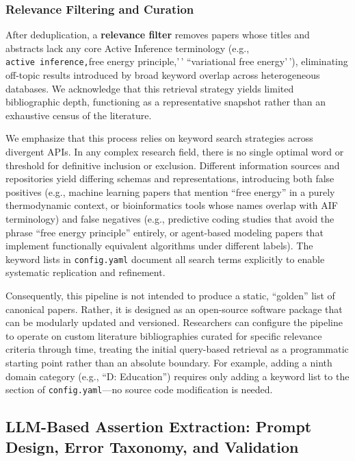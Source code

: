 \documentclass[
  english,
]{article}
\begin{document}
\subsubsection{Relevance Filtering and
Curation}\label{relevance-filtering-and-curation}

After deduplication, a \textbf{relevance filter} removes papers whose
titles and abstracts lack any core Active Inference terminology (e.g.,
\texttt{active\ inference,\textquotesingle{}\textquotesingle{}}free
energy principle,'\,' ``variational free energy'\,'), eliminating
off-topic results introduced by broad keyword overlap across
heterogeneous databases. We acknowledge that this retrieval strategy
yields limited bibliographic depth, functioning as a representative
snapshot rather than an exhaustive census of the literature.

We emphasize that this process relies on keyword search strategies
across divergent APIs. In any complex research field, there is no single
optimal word or threshold for definitive inclusion or exclusion.
Different information sources and repositories yield differing schemas
and representations, introducing both false positives (e.g., machine
learning papers that mention ``free energy'' in a purely thermodynamic
context, or bioinformatics tools whose names overlap with AIF
terminology) and false negatives (e.g., predictive coding studies that
avoid the phrase ``free energy principle'' entirely, or agent-based
modeling papers that implement functionally equivalent algorithms under
different labels). The keyword lists in \texttt{config.yaml} document
all search terms explicitly to enable systematic replication and
refinement.

Consequently, this pipeline is not intended to produce a static,
``golden'' list of canonical papers. Rather, it is designed as an
open-source software package that can be modularly updated and
versioned. Researchers can configure the pipeline to operate on custom
literature bibliographies curated for specific relevance criteria
through time, treating the initial query-based retrieval as a
programmatic starting point rather than an absolute boundary. For
example, adding a ninth domain category (e.g., ``D: Education'')
requires only adding a keyword list to the 
section of \texttt{config.yaml}---no source code modification is needed.

\newpage

\subsection{\texorpdfstring{LLM-Based Assertion Extraction: Prompt
Design, Error Taxonomy, and Validation
\label{sec:extraction_pipeline}}{LLM-Based Assertion Extraction: Prompt Design, Error Taxonomy, and Validation}}\label{llm-based-assertion-extraction-prompt-design-error-taxonomy-and-validation}
\end{document}
